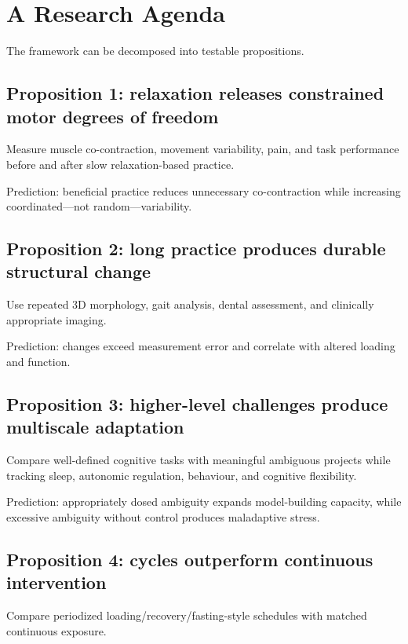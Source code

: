 \chapter{A Research Agenda}

The framework can be decomposed into testable propositions.

\section{Proposition 1: relaxation releases constrained motor degrees of freedom}

Measure muscle co-contraction, movement variability, pain, and task performance before and after slow relaxation-based practice.

Prediction: beneficial practice reduces unnecessary co-contraction while increasing coordinated---not random---variability.

\section{Proposition 2: long practice produces durable structural change}

Use repeated 3D morphology, gait analysis, dental assessment, and clinically appropriate imaging.

Prediction: changes exceed measurement error and correlate with altered loading and function.

\section{Proposition 3: higher-level challenges produce multiscale adaptation}

Compare well-defined cognitive tasks with meaningful ambiguous projects while tracking sleep, autonomic regulation, behaviour, and cognitive flexibility.

Prediction: appropriately dosed ambiguity expands model-building capacity, while excessive ambiguity without control produces maladaptive stress.

\section{Proposition 4: cycles outperform continuous intervention}

Compare periodized loading/recovery/fasting-style schedules with matched continuous exposure.

